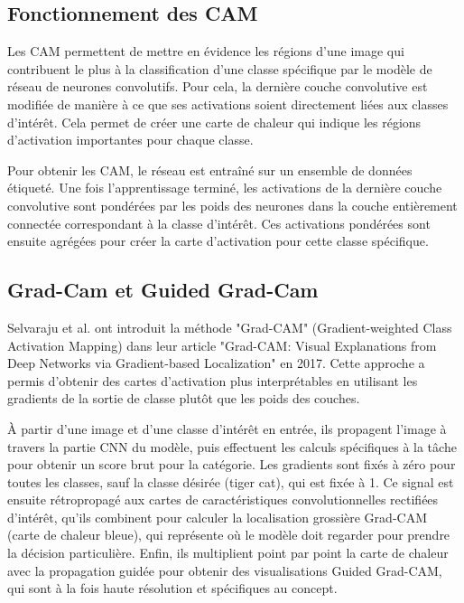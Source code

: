 \documentclass{report}
\begin{document}
{\subsection{Fonctionnement des CAM}

\hspace{1.6cm}Les CAM permettent de mettre en évidence les régions d'une image qui contribuent le plus à la classification d'une classe spécifique par le modèle de réseau de neurones convolutifs. Pour cela, la dernière couche convolutive est modifiée de manière à ce que ses activations soient directement liées aux classes d'intérêt. Cela permet de créer une carte de chaleur qui indique les régions d'activation importantes pour chaque classe.
\vspace*{0.5\baselineskip}

\hspace{1.6cm}Pour obtenir les CAM, le réseau est entraîné sur un ensemble de données étiqueté. Une fois l'apprentissage terminé, les activations de la dernière couche convolutive sont pondérées par les poids des neurones dans la couche entièrement connectée correspondant à la classe d'intérêt. Ces activations pondérées sont ensuite agrégées pour créer la carte d'activation pour cette classe spécifique.

\subsection{Grad-Cam et Guided Grad-Cam }

\hspace{1.6cm}Selvaraju et al. \cite{Selvaraju_2017_ICCV} ont introduit la méthode "Grad-CAM" (Gradient-weighted Class Activation Mapping) dans leur article "Grad-CAM: Visual Explanations from Deep Networks via Gradient-based Localization" en 2017. Cette approche a permis d'obtenir des cartes d'activation plus interprétables en utilisant les gradients de la sortie de classe plutôt que les poids des couches.
\vspace*{0.5\baselineskip}

\hspace{1.6cm}À partir d'une image et d'une classe d'intérêt en entrée, ils propagent l'image à travers la partie CNN du modèle, puis effectuent les calculs spécifiques à la tâche pour obtenir un score brut pour la catégorie. Les gradients sont fixés à zéro pour toutes les classes, sauf la classe désirée (tiger cat), qui est fixée à 1. Ce signal est ensuite rétropropagé aux cartes de caractéristiques convolutionnelles rectifiées d'intérêt, qu'ils combinent pour calculer la localisation grossière Grad-CAM (carte de chaleur bleue), qui représente où le modèle doit regarder pour prendre la décision particulière. Enfin, ils multiplient point par point la carte de chaleur avec la propagation guidée pour obtenir des visualisations Guided Grad-CAM, qui sont à la fois haute résolution et spécifiques au concept.
\vspace*{0.5\baselineskip}

}
\end{document}
